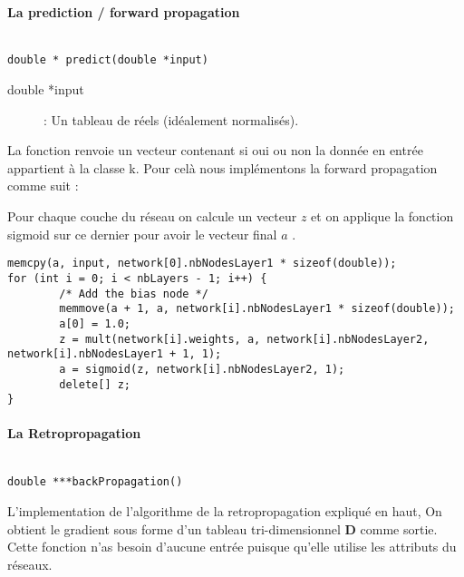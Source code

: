 \paragraph{La prediction / forward propagation }
\begin{verbatim}

double * predict(double *input)
\end{verbatim}

\begin{description}
    \item[double *input] : Un tableau de réels (idéalement normalisés).
\end{description}

La fonction renvoie un vecteur contenant si oui ou non la donnée en entrée appartient à la classe k.
Pour celà nous implémentons la forward propagation comme suit :

Pour chaque couche du réseau on calcule un vecteur $z$ et on applique la fonction sigmoid sur ce dernier pour avoir le vecteur final $a$ .
\begin{verbatim}
memcpy(a, input, network[0].nbNodesLayer1 * sizeof(double));
for (int i = 0; i < nbLayers - 1; i++) {
		/* Add the bias node */
		memmove(a + 1, a, network[i].nbNodesLayer1 * sizeof(double));
		a[0] = 1.0;
		z = mult(network[i].weights, a, network[i].nbNodesLayer2, network[i].nbNodesLayer1 + 1, 1);
		a = sigmoid(z, network[i].nbNodesLayer2, 1);
		delete[] z;
}
\end{verbatim}

\paragraph{La Retropropagation }
\begin{verbatim}

double ***backPropagation()
\end{verbatim}

L'implementation de l'algorithme de la retropropagation expliqué en haut, On obtient le gradient sous forme d'un tableau tri-dimensionnel \textbf{D} comme sortie. Cette fonction n'as besoin d'aucune entrée puisque qu'elle utilise les attributs du réseaux.

